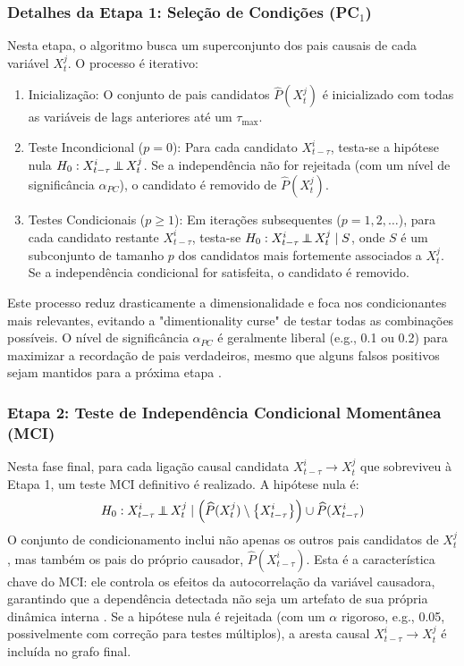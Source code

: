 \documentclass[12pt, a4paper]{article}
\newcommand{\indep}{\perp\kern-0.9em\perp}
\begin{document}
\subsubsection*{Detalhes da Etapa 1: Seleção de Condições (PC$_1$)}

Nesta etapa, o algoritmo busca um superconjunto dos pais causais de cada variável $X^j_t$. O processo é iterativo:
\begin{enumerate}
    \item Inicialização: O conjunto de pais candidatos $\widehat{P}(X^j_t)$ é inicializado com todas as variáveis de lags anteriores até um $\tau_{\max}$.
    
    \item Teste Incondicional ($p=0$): Para cada candidato $X^i_{t-\tau}$, testa-se a hipótese nula $H_0: X^i_{t-\tau} \indep X^j_t$. Se a independência não for rejeitada (com um nível de significância $\alpha_{PC}$), o candidato é removido de $\widehat{P}(X^j_t)$.
    
    \item Testes Condicionais ($p \ge 1$): Em iterações subsequentes ($p=1, 2, \dots$), para cada candidato restante $X^i_{t-\tau}$, testa-se $H_0: X^i_{t-\tau} \indep X^j_t \mid S$, onde $S$ é um subconjunto de tamanho $p$ dos candidatos mais fortemente associados a $X^j_t$. Se a independência condicional for satisfeita, o candidato é removido.
\end{enumerate}
Este processo reduz drasticamente a dimensionalidade e foca nos condicionantes mais relevantes, evitando a "dimentionality curse" de testar todas as combinações possíveis. O nível de significância $\alpha_{PC}$ é geralmente liberal (e.g., 0.1 ou 0.2) para maximizar a recordação de pais verdadeiros, mesmo que alguns falsos positivos sejam mantidos para a próxima etapa \cite{runge2019}.

\subsubsection*{Etapa 2: Teste de Independência Condicional Momentânea (MCI)}

Nesta fase final, para cada ligação causal candidata $X^i_{t-\tau} \to X^j_t$ que sobreviveu à Etapa 1, um teste MCI definitivo é realizado. A hipótese nula é:
$$
H_{0}: X_{t-\tau}^{i} \indep X_{t}^{j} \mid \left(\widehat{P}(X_{t}^{j}) \setminus \left\{X_{t-\tau}^{i}\right\}\right) \cup \widehat{P}(X_{t-\tau}^{i})
$$
O conjunto de condicionamento inclui não apenas os outros pais candidatos de $X^j_t$, mas também os pais do próprio causador, $\widehat{P}(X^i_{t-\tau})$. Esta é a característica chave do MCI: ele controla os efeitos da autocorrelação da variável causadora, garantindo que a dependência detectada não seja um artefato de sua própria dinâmica interna \cite{runge2018}. Se a hipótese nula é rejeitada (com um $\alpha$ rigoroso, e.g., 0.05, possivelmente com correção para testes múltiplos), a aresta causal $X^i_{t-\tau} \to X^j_t$ é incluída no grafo final.
\end{document}

